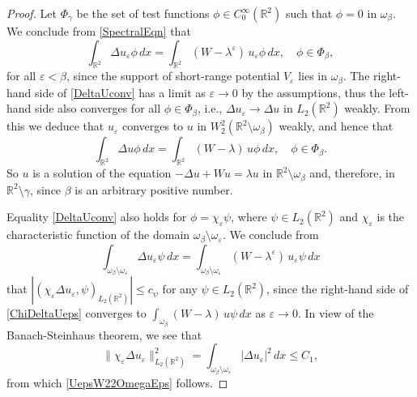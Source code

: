 \documentclass[reqno]{amsart}
\theoremstyle{plain}
\numberwithin{equation}{section}
\newcommand{\Real}{\mathbb R}
\newcommand{\eps}{\varepsilon}
\renewcommand{\leq}{\leqslant}
\begin{document}
\begin{proof}
  Let $\Phi_\gamma$ be the set of test functions $\phi\in C_0^\infty(\Real^2)$ such that $\phi=0$ in $\omega_\beta$. We conclude from \eqref{SpectralEqn} that
  \begin{equation}\label{DeltaUconv}
    \int_{\Real^2} \Delta u_\eps\phi\,dx=\int_{\Real^2} (W-\lambda^\eps)\,u_\eps\phi\,dx, \quad\phi\in \Phi_\beta,
  \end{equation}
for all $\eps<\beta$, since the support of short-range potential $V_\eps$ lies in $\omega_\beta$. The right-hand side of \eqref{DeltaUconv} has a limit as $\eps\to 0$ by the assumptions, thus the left-hand side also converges for all $\phi\in \Phi_\beta$, i.e., $\Delta u_\eps\to \Delta u$ in $L_2(\Real^2)$ weakly. From this we deduce that $u_\eps$ converges to $u$ in  $W_2^2(\Real^2\setminus \omega_\beta)$ weakly, and hence that
  \begin{equation*}
    \int_{\Real^2} \Delta u\phi\,dx=\int_{\Real^2} (W-\lambda)\,u\phi\,dx, \quad\phi\in \Phi_\beta.
  \end{equation*}
So $u$ is a solution of the equation  $-\Delta u+Wu=\lambda u$
in $\Real^2\setminus \omega_\beta$  and, therefore,  in $\Real^2\setminus \gamma$, since $\beta$ is an arbitrary positive number.


Equality \eqref{DeltaUconv} also holds for $\phi=\chi_{\eps}\psi$, where $\psi\in L_2(\Real^2)$ and $\chi_{\eps}$ is the characteristic function of the domain $\omega_\beta\setminus\omega_\eps$. We conclude from
 \begin{equation}\label{ChiDeltaUeps}
 \int_{\omega_\beta\setminus\omega_\eps} \Delta u_\eps\psi\,dx=\int_{\omega_\beta\setminus\omega_\eps} (W-\lambda^\eps)\,u_\eps\psi\,dx
  \end{equation}
that $|(\chi_\eps \Delta u_\eps, \psi)_{L_2(\Real^2)}|\leq c_\psi$ for any $\psi\in L_2(\Real^2)$, since the right-hand side of \eqref{ChiDeltaUeps} converges to $\int_{\omega_\beta} (W-\lambda)\,u\psi\,dx$ as $\eps\to 0$.
In view of the Banach-Steinhaus theorem, we see that
\begin{equation*}
  \|\chi_\eps \Delta u_\eps\|_{L_2(\Real^2)}^2= \int_{\omega_\beta\setminus\omega_\eps} |\Delta u_\eps|^2\,dx\leq C_1,
\end{equation*}
from which \eqref{UepsW22OmegaEps} follows.


\end{proof}
\end{document}
